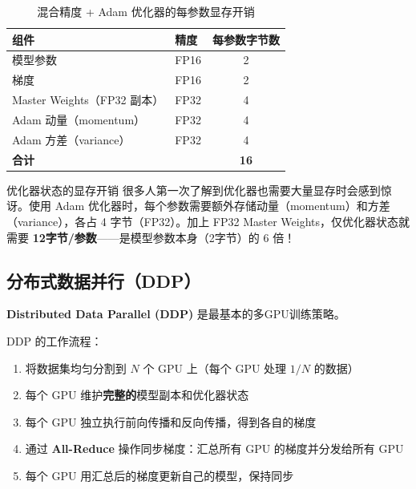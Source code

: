 \documentclass[a4paper]{article}
\begin{document}
\begin{table}[H]
\centering
\begin{tabular}{llc}
\toprule
\textbf{组件} & \textbf{精度} & \textbf{每参数字节数} \\
\midrule
模型参数     & FP16 & 2 \\
梯度        & FP16 & 2 \\
Master Weights（FP32 副本） & FP32 & 4 \\
Adam 动量（momentum）       & FP32 & 4 \\
Adam 方差（variance）       & FP32 & 4 \\
\midrule
\textbf{合计} & & \textbf{16} \\
\bottomrule
\end{tabular}
\caption{混合精度 + Adam 优化器的每参数显存开销}
\end{table}

\begin{knowledgebox}{优化器状态的显存开销}
很多人第一次了解到优化器也需要大量显存时会感到惊讶。使用 Adam 优化器时，每个参数需要额外存储动量（momentum）和方差（variance），各占 4 字节（FP32）。加上 FP32 Master Weights，仅优化器状态就需要 \textbf{12字节/参数}——是模型参数本身（2字节）的 6 倍！
\end{knowledgebox}

\subsection{分布式数据并行（DDP）}

\textbf{Distributed Data Parallel (DDP)} 是最基本的多GPU训练策略。





DDP 的工作流程：
\begin{enumerate}
    \item 将数据集均匀分割到 $N$ 个 GPU 上（每个 GPU 处理 $1/N$ 的数据）
    \item 每个 GPU 维护\textbf{完整的}模型副本和优化器状态
    \item 每个 GPU 独立执行前向传播和反向传播，得到各自的梯度
    \item 通过 \textbf{All-Reduce} 操作同步梯度：汇总所有 GPU 的梯度并分发给所有 GPU
    \item 每个 GPU 用汇总后的梯度更新自己的模型，保持同步
\end{enumerate}


\end{document}
